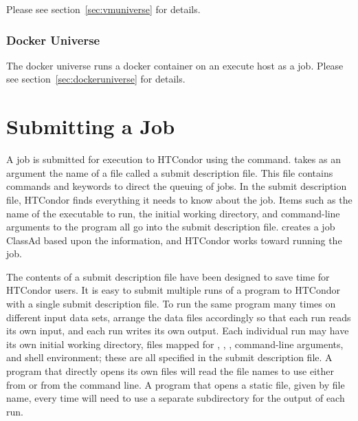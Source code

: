 Please see section~\ref{sec:vmuniverse} for details.

\subsubsection{Docker Universe}
The docker universe runs a docker container on an execute host
as a job.  
Please see section~\ref{sec:dockeruniverse} for details.

\section{\label{sec:submitting}Submitting a Job}

A job is submitted for execution to HTCondor using the
 command.
 takes as an argument the name of a
file called a submit description file.
This file contains commands and keywords to direct the queuing of jobs.
In the submit description file, HTCondor finds everything it needs
to know about the job.  Items such as the name of the executable to run,
the initial working directory, and command-line arguments to the
program all go into
the submit description file.   creates a job
ClassAd based upon the information,
and HTCondor
works toward running the job.

The contents of a submit description file have been designed to
save time for HTCondor users.
It is easy to submit multiple runs of a program to HTCondor
with a single submit description file.
To run the same program many times on
different input data sets, arrange the data files
accordingly so that each run reads its own input, and each run
writes its own output.
Each individual run may have its own initial
working directory, files mapped for , ,
, command-line arguments, and
shell environment;  these are all specified in the submit description file.
A program that directly opens its own
files will read the file names to use either from 
or from the command line. 
A program that opens a static file, given by file name, every time
will need to use a separate subdirectory for the output of each run.

